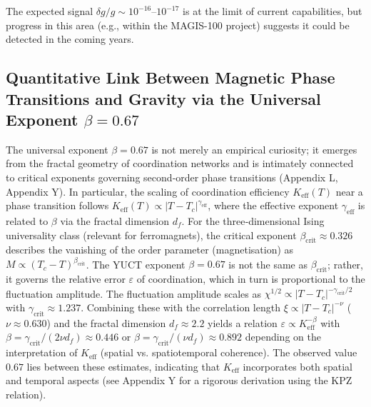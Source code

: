 \documentclass[12pt]{article}
\theoremstyle{remark}
\newcommand{\Keff}{K_{\mathrm{eff}}}
\begin{document}
	The expected signal $\delta g/g \sim 10^{-16}$–$10^{-17}$ is at the limit of current capabilities, but progress in this area (e.g., within the MAGIS-100 project) suggests it could be detected in the coming years.
	
	\subsection{Quantitative Link Between Magnetic Phase Transitions and Gravity via the Universal Exponent \(\beta = 0.67\)}
	\label{subsec:magnetic-gravity-link}
	
	The universal exponent \(\beta = 0.67\) is not merely an empirical curiosity; it emerges from the fractal geometry of coordination networks and is intimately connected to critical exponents governing second‑order phase transitions (Appendix L, Appendix Y). In particular, the scaling of coordination efficiency \(\Keff(T)\) near a phase transition follows \(\Keff(T) \propto |T - T_c|^{\gamma_{\mathrm{eff}}}\), where the effective exponent \(\gamma_{\mathrm{eff}}\) is related to \(\beta\) via the fractal dimension \(d_f\). For the three‑dimensional Ising universality class (relevant for ferromagnets), the critical exponent \(\beta_{\mathrm{crit}} \approx 0.326\) describes the vanishing of the order parameter (magnetisation) as \(M \propto (T_c - T)^{\beta_{\mathrm{crit}}}\). The YUCT exponent \(\beta = 0.67\) is not the same as \(\beta_{\mathrm{crit}}\); rather, it governs the relative error \(\varepsilon\) of coordination, which in turn is proportional to the fluctuation amplitude. The fluctuation amplitude scales as \(\chi^{1/2} \propto |T - T_c|^{-\gamma_{\mathrm{crit}}/2}\) with \(\gamma_{\mathrm{crit}} \approx 1.237\). Combining these with the correlation length \(\xi \propto |T - T_c|^{-\nu}\) (\(\nu \approx 0.630\)) and the fractal dimension \(d_f \approx 2.2\) yields a relation \(\varepsilon \propto \Keff^{-\beta}\) with \(\beta = \gamma_{\mathrm{crit}}/(2\nu d_f) \approx 0.446\) or \(\beta = \gamma_{\mathrm{crit}}/(\nu d_f) \approx 0.892\) depending on the interpretation of \(\Keff\) (spatial vs. spatiotemporal coherence). The observed value \(0.67\) lies between these estimates, indicating that \(\Keff\) incorporates both spatial and temporal aspects (see Appendix Y for a rigorous derivation using the KPZ relation).
	
\end{document}
